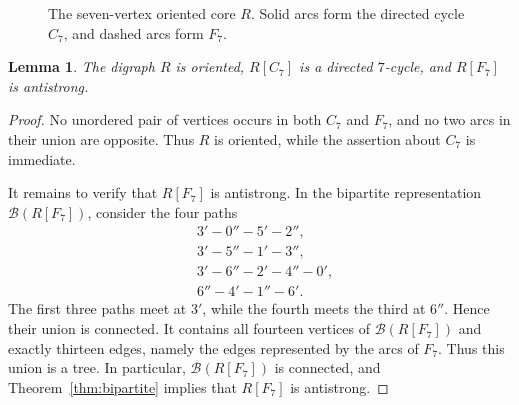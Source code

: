 \documentclass[12pt]{article}
\newtheorem{lemma}[theorem]{Lemma}
\theoremstyle{remark}
\newcommand{\cB}{\mathcal{B}}
\begin{document}
\begin{figure}[htbp]
\centering
{}
\caption{The seven-vertex oriented core $R$.  Solid arcs form the
directed cycle $C_7$, and dashed arcs form $F_7$.}
\label{fig:oriented-core-R}
\end{figure}

\begin{lemma}\label{lem:oriented-core}
The digraph $R$ is oriented, $R[C_7]$ is a directed $7$-cycle, and $R[F_7]$ is antistrong.
\end{lemma}

\begin{proof}
No unordered pair of vertices occurs in both $C_7$ and $F_7$, and no two arcs in their union are opposite.  Thus $R$ is oriented, while the assertion about $C_7$ is immediate.

It remains to verify that $R[F_7]$ is antistrong. In the bipartite representation $\cB(R[F_7])$, consider the four paths
\begin{align*}
 &3'-0''-5'-2'',\\
 &3'-5''-1'-3'',\\
 &3'-6''-2'-4''-0',\\
 &6''-4'-1''-6'.
\end{align*}
The first three paths meet at $3'$, while the fourth meets the third at $6''$. Hence their union is connected. It contains all fourteen vertices of $\cB(R[F_7])$ and exactly thirteen edges, namely the edges represented by the arcs of $F_7$. Thus this union is a tree. In particular, $\cB(R[F_7])$ is connected, and Theorem~\ref{thm:bipartite} implies that $R[F_7]$ is antistrong.
\end{proof}
\end{document}
